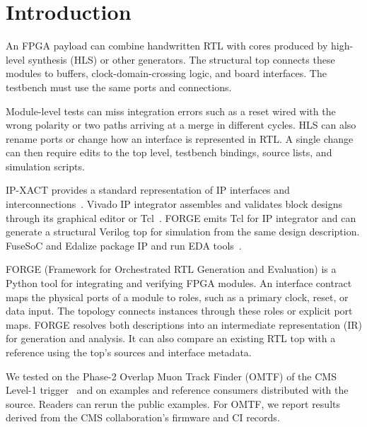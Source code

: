 \section{Introduction}
\label{sec:intro}

An FPGA payload can combine handwritten RTL with cores produced by high-level synthesis (HLS) or other generators. The structural top connects these modules to buffers, clock-domain-crossing logic, and board interfaces. The testbench must use the same ports and connections.

Module-level tests can miss integration errors such as a reset wired with the wrong polarity or two paths arriving at a merge in different cycles. HLS can also rename ports or change how an interface is represented in RTL. A single change can then require edits to the top level, testbench bindings, source lists, and simulation scripts.

IP-XACT provides a standard representation of IP interfaces and interconnections~\cite{IEEE_IPXACT_1685_2022}. Vivado IP integrator assembles and validates block designs through its graphical editor or Tcl~\cite{AMD_Vivado_IPI_UG994}. FORGE emits Tcl for IP integrator and can generate a structural Verilog top for simulation from the same design description. FuseSoC and Edalize package IP and run EDA tools~\cite{Kindgren2019_FuseSoC}.

FORGE (Framework for Orchestrated RTL Generation and Evaluation) is a Python tool for integrating and verifying FPGA modules. An interface contract maps the physical ports of a module to roles, such as a primary clock, reset, or data input. The topology connects instances through these roles or explicit port maps. FORGE resolves both descriptions into an intermediate representation (IR) for generation and analysis. It can also compare an existing RTL top with a reference using the top's sources and interface metadata.

We tested \forge{} on the Phase-2 Overlap Muon Track Finder (OMTF) of the CMS Level-1 trigger~\cite{CMS_2020_L1TriggerUpgrade_TDR} and on examples and reference consumers distributed with the source. Readers can rerun the public examples. For OMTF, we report results derived from the CMS collaboration's firmware and CI records.

